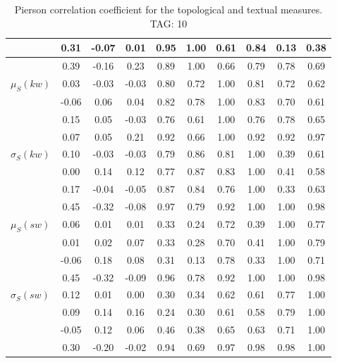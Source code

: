 \begin{table*}[h!]
\begin{center}
\begin{tabular}{| l | c | c | c | c | c | c | c | c | c |}
 & 0.31  & -0.07  & 0.01  & 0.95  & 1.00  & 0.61  & 0.84  & 0.13  & 0.38 \\\hline
 & 0.39  & -0.16  & 0.23  & 0.89  & 1.00  & 0.66  & 0.79  & 0.78  & 0.69 \\\hline
$\mu_S(kw)$ & 0.03  & -0.03  & -0.03  & 0.80  & 0.72  & 1.00  & 0.81  & 0.72  & 0.62 \\\hline
 & -0.06  & 0.06  & 0.04  & 0.82  & 0.78  & 1.00  & 0.83  & 0.70  & 0.61 \\\hline
 & 0.15  & 0.05  & -0.03  & 0.76  & 0.61  & 1.00  & 0.76  & 0.78  & 0.65 \\\hline
 & 0.07  & 0.05  & 0.21  & 0.92  & 0.66  & 1.00  & 0.92  & 0.92  & 0.97 \\\hline
$\sigma_S(kw)$ & 0.10  & -0.03  & -0.03  & 0.79  & 0.86  & 0.81  & 1.00  & 0.39  & 0.61 \\\hline
 & 0.00  & 0.14  & 0.12  & 0.77  & 0.87  & 0.83  & 1.00  & 0.41  & 0.58 \\\hline
 & 0.17  & -0.04  & -0.05  & 0.87  & 0.84  & 0.76  & 1.00  & 0.33  & 0.63 \\\hline
 & 0.45  & -0.32  & -0.08  & 0.97  & 0.79  & 0.92  & 1.00  & 1.00  & 0.98 \\\hline
$\mu_S(sw)$ & 0.06  & 0.01  & 0.01  & 0.33  & 0.24  & 0.72  & 0.39  & 1.00  & 0.77 \\\hline
 & 0.01  & 0.02  & 0.07  & 0.33  & 0.28  & 0.70  & 0.41  & 1.00  & 0.79 \\\hline
 & -0.06  & 0.18  & 0.08  & 0.31  & 0.13  & 0.78  & 0.33  & 1.00  & 0.71 \\\hline
 & 0.45  & -0.32  & -0.09  & 0.96  & 0.78  & 0.92  & 1.00  & 1.00  & 0.98 \\\hline
$\sigma_S(sw)$ & 0.12  & 0.01  & 0.00  & 0.30  & 0.34  & 0.62  & 0.61  & 0.77  & 1.00 \\\hline
 & 0.09  & 0.14  & 0.16  & 0.24  & 0.30  & 0.61  & 0.58  & 0.79  & 1.00 \\\hline
 & -0.05  & 0.12  & 0.06  & 0.46  & 0.38  & 0.65  & 0.63  & 0.71  & 1.00 \\\hline
 & 0.30  & -0.20  & -0.02  & 0.94  & 0.69  & 0.97  & 0.98  & 0.98  & 1.00 \\\hline
\end{tabular}
\caption{Pierson correlation coefficient for the topological and textual measures. TAG: 10}
\end{center}
\end{table*}
